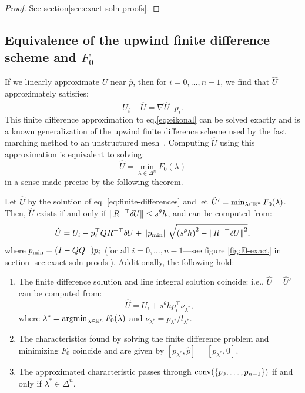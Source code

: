 \documentclass[smallcondensed]{svjour3}
\begin{document}
\begin{proof}
  See section\@ \ref{sec:exact-soln-proofs}.
\end{proof}

\subsection{Equivalence of the upwind finite difference scheme and
  $F_0$}\label{ssec:equivalence}

If we linearly approximate $U$ near $\hat{p}$, then for
$i = 0, \hdots, n - 1$, we find that $\hat{U}$ approximately
satisfies:
\begin{equation}
  \label{eq:finite-differences}
  U_i - \hat{U} = \nabla \hat{U}^\top p_i.
\end{equation}
This finite difference approximation to eq.\@ \ref{eq:eikonal} can
be solved exactly and is a known generalization of the upwind finite
difference scheme used by the fast marching method to an unstructured
mesh~\cite{kimmel1998computing,sethian2000fast}. Computing $\hat{U}$
using this approximation is equivalent to solving:
\begin{equation}
  \hat{U} = \min_{\lambda \in \Delta^n} F_0(\lambda)
\end{equation}
in a sense made precise by the following theorem.

\begin{theorem}\label{thm:equivalence}
  Let $\hat{U}$ by the solution of eq.\@
  \ref{eq:finite-differences} and let
  $\hat{U}' = \min_{\lambda \in \mathbb{R}^n} F_0(\lambda)$. Then, $\hat{U}$
  exists if and only if $\|R^{-\top} {\delta \hspace{-0.09em} U}\| \leq s^\theta h$, and can
  be computed from:
  \begin{equation}
    \label{eq:U-finite-diff}
    \hat{U} = U_i - p_i^\top Q R^{-\top} {\delta \hspace{-0.09em} U} + \left\|p_{\operatorname{min}}\right\| \sqrt{{(s^\theta h)}^2 - \left\|R^{-\top} {\delta \hspace{-0.09em} U}\right\|^2},
  \end{equation}
  where $p_{\operatorname{min}} = (I - QQ^\top) p_i$ (for all
  $i = 0, \hdots, n - 1$---see figure \ref{fig:f0-exact} in section\@
  \ref{sec:exact-soln-proofs}). Additionally, the following hold:
  \begin{enumerate}
  \item The finite difference solution and line integral solution
    coincide: i.e., $\hat{U} = \hat{U}'$ can be computed from:
    \begin{equation}
      \label{eq:U-from-Ui-exact}
      \hat{U} = U_i + s^\theta h p_i^\top \nu_{\lambda^*},
    \end{equation}
    where $\lambda^* = \operatorname{argmin}_{\lambda \in \mathbb{R}^n} F_0(\lambda)$ and
    $\nu_{\lambda^*} = p_{\lambda^*}/l_{\lambda^*}$.
  \item The characteristics found by solving the finite difference
    problem and minimizing $F_0$ coincide and are given by
    $[p_{\lambda^*}, \hat{p}] = [p_{\lambda^*}, 0]$.
  \item The approximated characteristic passes through
    $\operatorname{conv}(\left\{p_0, \hdots, p_{n-1}\right\})$ if and only if
    $\lambda^* \in \Delta^n$.
  \end{enumerate}
\end{theorem}
\end{document}
